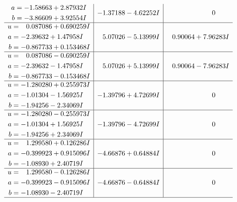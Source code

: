 \documentclass[1p]{elsarticle_modified}
\theoremstyle{definition}
\begin{document}
$$\begin{array}{c|c|c}
\begin{aligned}
a &= -1.58663 + 2.87932 I \\
b &= -3.86609 + 3.92554 I\end{aligned}
 & -1.37188 - 4.62252 I & \phantom{-0.000000 } 0 \\ \hline\begin{aligned}
u &= \phantom{-}0.087086 + 0.690259 I \\
a &= -2.39632 + 1.47958 I \\
b &= -0.867733 + 0.153468 I\end{aligned}
 & \phantom{-}5.07026 - 5.13999 I & \phantom{-}0.90064 + 7.96283 I \\ \hline\begin{aligned}
u &= \phantom{-}0.087086 - 0.690259 I \\
a &= -2.39632 - 1.47958 I \\
b &= -0.867733 - 0.153468 I\end{aligned}
 & \phantom{-}5.07026 + 5.13999 I & \phantom{-}0.90064 - 7.96283 I \\ \hline\begin{aligned}
u &= -1.280280 + 0.255973 I \\
a &= -1.01304 - 1.56925 I \\
b &= -1.94256 - 2.34069 I\end{aligned}
 & -1.39796 + 4.72699 I & \phantom{-0.000000 } 0 \\ \hline\begin{aligned}
u &= -1.280280 - 0.255973 I \\
a &= -1.01304 + 1.56925 I \\
b &= -1.94256 + 2.34069 I\end{aligned}
 & -1.39796 - 4.72699 I & \phantom{-0.000000 } 0 \\ \hline\begin{aligned}
u &= \phantom{-}1.299580 + 0.126286 I \\
a &= -0.399923 + 0.915096 I \\
b &= -1.08930 + 2.40719 I\end{aligned}
 & -4.66876 + 0.64884 I & \phantom{-0.000000 } 0 \\ \hline\begin{aligned}
u &= \phantom{-}1.299580 - 0.126286 I \\
a &= -0.399923 - 0.915096 I \\
b &= -1.08930 - 2.40719 I\end{aligned}
 & -4.66876 - 0.64884 I & \phantom{-0.000000 } 0\\
 \hline 
 \end{array}$$\newpage$$\begin{array}{c|c|c}  

\end{array}$$
\end{document}

